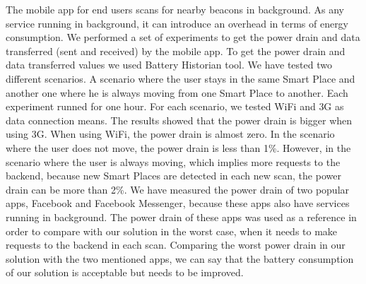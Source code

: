 The mobile app for end users scans for nearby beacons in background.
As any service running in background, it can introduce an overhead in terms of energy consumption.
We performed a set of experiments to get the power drain and data transferred (sent and received) by the mobile app.
To get the power drain and data transferred values we used Battery Historian tool.
We have tested two different scenarios. A scenario where the user stays in the same Smart Place and another one where he is always moving from one Smart Place to another.
Each experiment runned for one hour.
For each scenario, we tested \gls{WiFi} and \gls{3G} as data connection means.
The results showed that the power drain is bigger when using \gls{3G}. When using \gls{WiFi}, the power drain is almost zero.
In the scenario where the user does not move, the power drain is less than 1\%.
However, in the scenario where the user is always moving, which implies more requests to the backend, because new Smart Places are detected in each new scan, the power drain can be more than 2\%.
We have measured the power drain of two popular apps, Facebook and Facebook Messenger, because these apps also have services running in background.
The power drain of these apps was used as a reference in order to compare with our solution in the worst case, when it needs to make requests to the backend in each scan.
Comparing the worst power drain in our solution with the two mentioned apps, we can say that the battery consumption of our solution is acceptable but needs to be improved.
